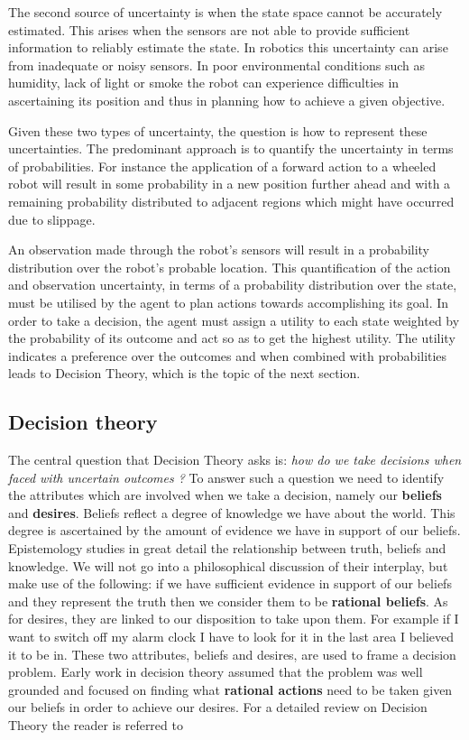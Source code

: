The second source of uncertainty is when the state space cannot be accurately estimated. This arises when the sensors are not able to 
provide sufficient information to reliably estimate the state. In robotics this uncertainty can arise from inadequate or noisy sensors. 
In poor environmental conditions such as humidity, lack of light or smoke the robot can experience difficulties in 
ascertaining its position and thus in planning how to achieve a given objective.

Given these two types of uncertainty, the question is how to represent these uncertainties. The predominant approach 
is to quantify the uncertainty in terms of probabilities. For instance the application of a forward action to a wheeled robot 
will result in some probability in a new position further ahead and with a remaining probability distributed to adjacent 
regions which might have occurred due to slippage.

An observation made through the robot's sensors will result in a probability distribution over the robot's probable location.
This quantification of the action and observation uncertainty, in terms of a probability distribution over the state, must
be utilised by the agent to plan actions towards accomplishing its goal. In order to take a decision, the agent must assign a utility 
to each state weighted by the probability of its outcome and act so as to get the highest utility. The utility indicates a 
preference over the outcomes and when combined with probabilities leads to Decision Theory, which is the topic of the next section. 

\subsection{Decision theory}\label{sec:ch2_DT}

The central question that Decision Theory asks is: \textit{how do we take decisions when faced with uncertain outcomes ?} To answer
such a question we need to identify the attributes which are involved when we take a decision, namely our \textbf{beliefs} and 
\textbf{desires}. Beliefs reflect a degree of knowledge we have about the world. This degree is ascertained by 
the amount of evidence we have in support of our beliefs. Epistemology studies in great detail the relationship between 
truth, beliefs and knowledge. We will not go into a philosophical discussion of their interplay, but make use of the following: 
if we have sufficient evidence in support of our beliefs and they represent the truth then we consider them to 
be \textbf{rational beliefs}. As for desires, they are linked to our disposition to take upon them. For 
example if I want to switch off my alarm clock I have to look for it in the last area I believed it to be in. 
These two attributes, beliefs and desires, are used to frame a decision problem. Early work in decision theory assumed 
that the problem was well grounded and focused on finding what \textbf{rational actions} need to be taken given our beliefs 
in order to achieve our desires. For a detailed review on Decision Theory the reader is referred to \cite{sep-decision-theory,North68atutorial}

